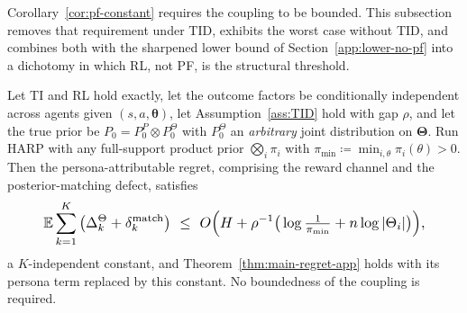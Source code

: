 Corollary~\ref{cor:pf-constant} requires the coupling to be bounded. This subsection removes that requirement under TID, exhibits the worst case without TID, and combines both with the sharpened lower bound of Section~\ref{app:lower-no-pf} into a dichotomy in which RL, not PF, is the structural threshold.

\begin{theorem}
\label{thm:any-coupling}
Let TI and RL hold exactly, let the outcome factors be conditionally independent across agents given $(s,a,\boldsymbol\theta)$, let Assumption~\ref{ass:TID} hold with gap $\rho$, and let the true prior be $P_0=P_0^P\otimes P_0^\Theta$ with $P_0^\Theta$ an \emph{arbitrary} joint distribution on $\boldsymbol\Theta$. Run HARP with any full-support product prior $\bigotimes_i\pi_i$ with $\pi_{\min}\coloneqq\min_{i,\theta}\pi_i(\theta)>0$. Then the persona-attributable regret, comprising the reward channel and the posterior-matching defect, satisfies
\begin{equation*}\resizebox{0.88\linewidth}{!}{$\displaystyle
\mathbb{E}\sum_{k=1}^K\big(\Delta_k^\Theta+\delta_k^{\mathrm{match}}\big)\ \le\ O\Big(H+\rho^{-1}\big(\log\tfrac1{\pi_{\min}}+n\log|\Theta_i|\big)\Big), $}
\end{equation*}
a $K$-independent constant, and Theorem~\ref{thm:main-regret-app} holds with its persona term replaced by this constant. No boundedness of the coupling is required.
\end{theorem}

